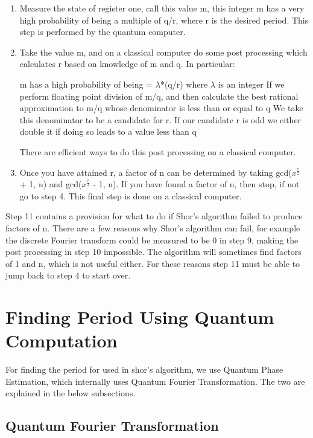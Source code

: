 \documentclass{article}
\begin{document}
\begin{enumerate}
    \item
    Measure the state of register one, call this value m, this integer m has a very high probability of being a multiple of q/r, where r is the desired period. This step is performed by the quantum computer.

    \item
    Take the value m, and on a classical computer do some post processing which calculates r based on knowledge of m and q. In particular:

        m has a high probability of being = $ \lambda$*(q/r) where $ \lambda$ is an integer
        If we perform floating point division of m/q, and then calculate the best rational approximation to m/q whose denominator is less than or equal to q
        We take this denominator to be a candidate for r.
        If our candidate r is odd we either double it if doing so leads to a value less than q

    There are efficient ways to do this post processing on a classical computer.

    \item
    Once you have attained r, a factor of n can be determined by taking gcd($x^\frac{r}{2}$ + 1, n) and gcd($x^\frac{r}{2}$ - 1, n). If you have found a factor of n, then stop, if not go to step 4. This final step is done on a classical computer.
\end{enumerate}

Step 11 contains a provision for what to do if Shor's algorithm failed to produce factors of n. There are a few reasons why Shor's algorithm can fail, for example the discrete Fourier transform could be measured to be 0 in step 9, making the post processing in step 10 impossible. The algorithm will sometimes find factors of 1 and n, which is not useful either. For these reasons step 11 must be able to jump back to step 4 to start over.

\section{Finding Period Using Quantum Computation}

For finding the period for used in shor's algorithm, we use Quantum Phase Estimation, which internally uses Quantum Fourier Transformation. The two are explained in the below subsections. 

\subsection{Quantum Fourier Transformation}
\end{document}
